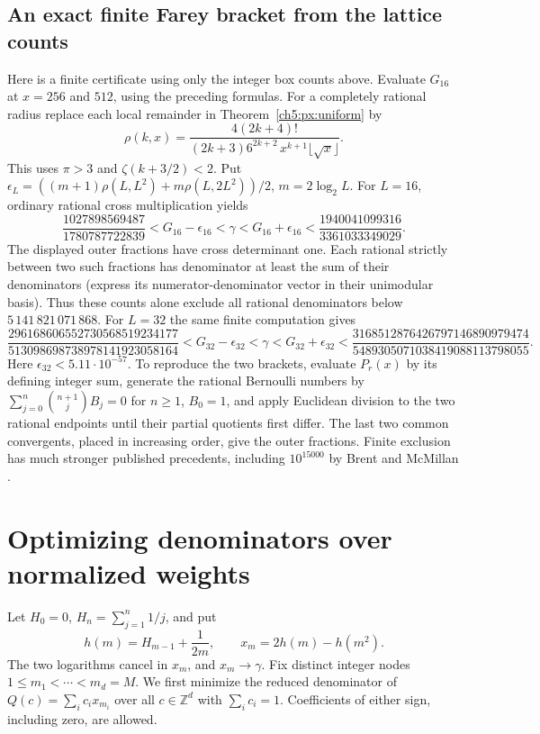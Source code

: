 \documentclass[11pt,a4paper,oneside,openany]{report}
\theoremstyle{remark}\newtheorem{remark}[theorem]{Remark}
\numberwithin{equation}{section}
\begin{document}
\subsection{An exact finite Farey bracket from the lattice counts}
Here is a finite certificate using only the integer box counts above. Evaluate $G_{16}$ at $x=256$ and $512$, using the preceding formulas. For a completely rational radius replace each local remainder in Theorem~\ref{ch5:px:uniform} by
\[
 \rho(k,x)=
 \frac{4(2k+4)!}{(2k+3)6^{2k+2}\,x^{k+1}\lfloor\sqrt{x}\rfloor}.
\]
This uses $\pi>3$ and $\zeta(k+3/2)<2$. Put
$\epsilon_L=((m+1)\rho(L,L^2)+m\rho(L,2L^2))/2$, $m=2\log_2 L$.
For $L=16$, ordinary rational cross multiplication yields
\[
 \frac{1027898569487}{1780787722839}
 <G_{16}-\epsilon_{16}<\gamma<G_{16}+\epsilon_{16}
 <\frac{1940041099316}{3361033349029}.
\]
The displayed outer fractions have cross determinant one. Each rational strictly between two such fractions has denominator at least the sum of their denominators (express its numerator-denominator vector in their unimodular basis). Thus these counts alone exclude all rational denominators below $5\,141\,821\,071\,868$. For $L=32$ the same finite computation gives
\[
 \frac{296168606552730568519234177}{513098698738978141923058164}
 <G_{32}-\epsilon_{32}<\gamma<G_{32}+\epsilon_{32}
 <\frac{3168512876426797146890979474}{5489305071038419088113798055}.
\]
Here $\epsilon_{32}<5.11\cdot10^{-57}$. To reproduce the two brackets, evaluate $P_r(x)$ by its defining integer sum, generate the rational Bernoulli numbers by $\sum_{j=0}^{n}\binom{n+1}j B_j=0$ for $n\ge1$, $B_0=1$, and apply Euclidean division to the two rational endpoints until their partial quotients first differ. The last two common convergents, placed in increasing order, give the outer fractions. Finite exclusion has much stronger published precedents, including $10^{15000}$ by Brent and McMillan \cite{brent}.
\section{Optimizing denominators over normalized weights}
\label{ch5:sec:weight-lattice}

Let $H_0=0$, $H_n=\sum_{j=1}^n1/j$, and put
\[
 h(m)=H_{m-1}+\frac1{2m},\qquad x_m=2h(m)-h(m^2).
\]
The two logarithms cancel in $x_m$, and $x_m\to\gamma$.
Fix distinct integer nodes $1\le m_1<\cdots<m_d=M$.
We first minimize the reduced denominator of
$Q(c)=\sum_i c_i x_{m_i}$ over all $c\in\mathbb Z^d$ with
$\sum_i c_i=1$. Coefficients of either sign, including zero, are allowed.
\end{document}
